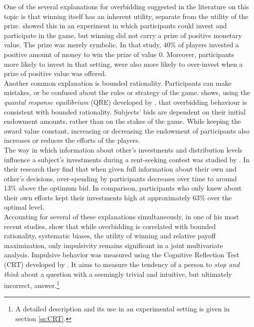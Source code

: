 One of the several explanations for overbidding suggested in the literature on this topic is that winning itself has an inherent utility, separate from the utility of the prize. \cite{sheremeta2010} showed this in an experiment in which participants could invest and participate in the game, but winning did not carry a prize of positive monetary value. The prize was merely symbolic. In that study, 40\% of players invested a positive amount of money to win the prize of value 0. Moreover, participants more likely to invest in that setting, were also more likely to over-invest when a prize of positive value was offered.\\

Another common explanation is bounded rationality. Participants can make mistakes, or be confused about the rules or strategy of the game. \cite{sheremeta2011} shows, using the \textit{quantal response equilibrium} (QRE) developed by \cite{mckelvey1995}, that overbidding behaviour is consistent with bounded rationality. Subjects' bids are dependent on their initial endowment amounts, rather than on the stakes of the game. While keeping the award value constant, increasing or decreasing the endowment of participants also increases or reduces the efforts of the players.\\ 

The way in which information about other's investments and distribution levels influence a subject's investments during a rent-seeking contest was studied by \cite{fallucchi2013}. In their research they find that when given full information about their own and other's decisions, over-spending by participants decreases over time to around 13\% above the optimum bid. In comparison, participants who only knew about their own efforts kept their investments high at approximately 63\% over the optimal level.\\

Accounting for several of these explanations simultaneously, in one of his most recent studies, \cite{sheremeta2016} show that while overbidding is correlated with bounded rationality, systematic biases, the utility of winning and relative payoff maximization, only impulsivity remains significant in a joint multivariate analysis. Impulsive behavior was measured using the Cognitive Reflection Test (CRT) developed by \cite{frederick2005}. It aims to measure the tendency of a person to \textit{stop and think} about a question with a seemingly trivial and intuitive, but ultimately incorrect, answer.\footnote{A detailed description and its use in an experimental setting is given in section \ref{ss:CRT}.}\\

